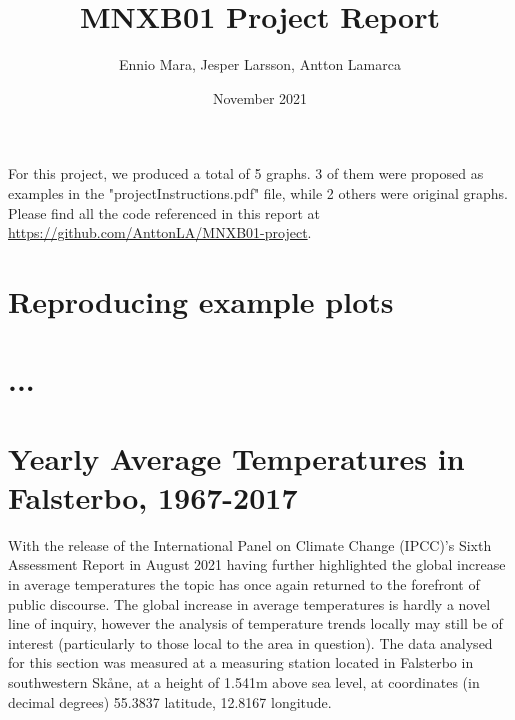 \documentclass{article}
\title{MNXB01 Project Report}
\author{Ennio Mara, Jesper Larsson, Antton Lamarca }
\date{November 2021}
\begin{document}
\maketitle

For this project, we produced a total of 5 graphs. 3 of them were proposed as examples in the "projectInstructions.pdf" file, while 2 others were original graphs. Please find all the code referenced in this report at \url{https://github.com/AnttonLA/MNXB01-project}.

\section{Reproducing example plots}







\section{...}

\section{Yearly Average Temperatures in Falsterbo, 1967-2017}
With the release of the International Panel on Climate Change (IPCC)'s Sixth Assessment Report\cite{IPCC} in August 2021 having further highlighted the global increase in average temperatures the topic has once again returned to the forefront of public discourse. The global increase in average temperatures is hardly a novel line of inquiry, however the analysis of temperature trends locally may still be of interest (particularly to those local to the area in question). The data analysed for this section was measured at a measuring station located in Falsterbo in southwestern Skåne, at a height of 1.541m above sea level, at coordinates (in decimal degrees) 55.3837 latitude, 12.8167 longitude.
\end{document}
